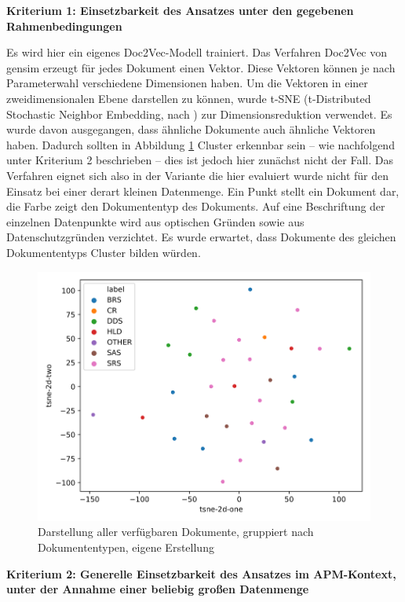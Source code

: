 {\bf Kriterium 1: Einsetzbarkeit des Ansatzes unter den gegebenen Rahmenbedingungen}

Es wird hier ein eigenes Doc2Vec-Modell trainiert. Das Verfahren Doc2Vec von gensim erzeugt für jedes Dokument einen Vektor. Diese Vektoren können je nach Parameterwahl verschiedene Dimensionen haben. Um die Vektoren in einer zweidimensionalen Ebene darstellen zu können, wurde t-SNE (t-Distributed Stochastic Neighbor Embedding, nach \cite{t-SNE}) zur Dimensionsreduktion verwendet. Es wurde davon ausgegangen, dass ähnliche Dokumente auch ähnliche Vektoren haben. Dadurch sollten in Abbildung \ref{Abbildung:doc2vec1} Cluster erkennbar sein – wie nachfolgend unter Kriterium 2 beschrieben – dies ist jedoch hier zunächst nicht der Fall. Das Verfahren eignet sich also in der Variante die hier evaluiert wurde nicht für den Einsatz bei einer derart kleinen Datenmenge. Ein Punkt stellt ein Dokument dar, die Farbe zeigt den Dokumententyp des Dokuments. Auf eine Beschriftung der einzelnen Datenpunkte wird aus optischen Gründen sowie aus Datenschutzgründen verzichtet. Es wurde erwartet, dass Dokumente des gleichen Dokumententyps Cluster bilden würden.

\begin{figure}[h]
\centering
\includegraphics[scale=0.95]{content/pics/Picture_14.png}
\caption{Darstellung aller verfügbaren Dokumente, gruppiert nach Dokumententypen, eigene Erstellung}
\label{Abbildung:doc2vec1}
\end{figure}

{\bf Kriterium 2: Generelle Einsetzbarkeit des Ansatzes im APM-Kontext, unter der Annahme einer beliebig großen Datenmenge}

